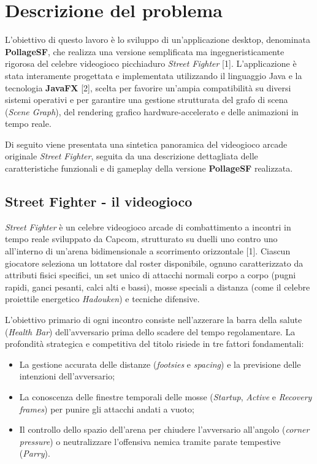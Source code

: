 \documentclass[11pt, a4paper]{article}
\begin{document}
	\section{Descrizione del problema}
	L'obiettivo di questo lavoro è lo sviluppo di un'applicazione desktop, denominata \textbf{PollageSF}, che realizza una versione semplificata ma ingegneristicamente rigorosa del celebre videogioco picchiaduro \emph{Street Fighter} [1]. L'applicazione è stata interamente progettata e implementata utilizzando il linguaggio Java e la tecnologia \textbf{JavaFX} [2], scelta per favorire un'ampia compatibilità su diversi sistemi operativi e per garantire una gestione strutturata del grafo di scena (\emph{Scene Graph}), del rendering grafico hardware-accelerato e delle animazioni in tempo reale.
	
	Di seguito viene presentata una sintetica panoramica del videogioco arcade originale \emph{Street Fighter}, seguita da una descrizione dettagliata delle caratteristiche funzionali e di gameplay della versione \textbf{PollageSF} realizzata.
	
	\subsection{Street Fighter - il videogioco}
	\emph{Street Fighter} è un celebre videogioco arcade di combattimento a incontri in tempo reale sviluppato da Capcom, strutturato su duelli uno contro uno all'interno di un'arena bidimensionale a scorrimento orizzontale [1]. Ciascun giocatore seleziona un lottatore dal roster disponibile, ognuno caratterizzato da attributi fisici specifici, un set unico di attacchi normali corpo a corpo (pugni rapidi, ganci pesanti, calci alti e bassi), mosse speciali a distanza (come il celebre proiettile energetico \emph{Hadouken}) e tecniche difensive.
	
	L'obiettivo primario di ogni incontro consiste nell'azzerare la barra della salute (\emph{Health Bar}) dell'avversario prima dello scadere del tempo regolamentare. La profondità strategica e competitiva del titolo risiede in tre fattori fondamentali:
	\begin{itemize}
		\item La gestione accurata delle distanze (\emph{footsies} e \emph{spacing}) e la previsione delle intenzioni dell'avversario;
		\item La conoscenza delle finestre temporali delle mosse (\emph{Startup}, \emph{Active} e \emph{Recovery frames}) per punire gli attacchi andati a vuoto;
		\item Il controllo dello spazio dell'arena per chiudere l'avversario all'angolo (\emph{corner pressure}) o neutralizzare l'offensiva nemica tramite parate tempestive (\emph{Parry}).
	\end{itemize}
	
\end{document}
